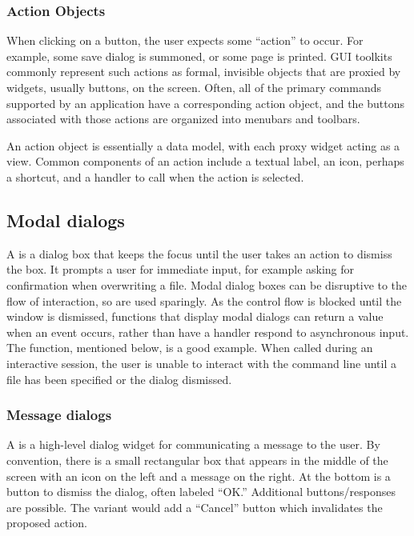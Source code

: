 \subsubsection{Action Objects}
\label{sec:GUI:actions}

When clicking on a button, the user expects some ``action'' to
occur. For example, some save dialog is summoned, or some page is
printed.  GUI toolkits commonly represent such actions as formal,
invisible objects that are proxied by widgets, usually buttons, on the
screen.  Often, all of the primary commands supported by an
application have a corresponding action object, and the buttons
associated with those actions are organized into menubars and
toolbars.

An action object is essentially a data model, with each proxy widget
acting as a view. Common components of an action include a textual
label, an icon, perhaps a shortcut, and a handler to call
when the action is selected.


\subsection{Modal dialogs}
\label{sec:GUI:modal-dialogs}

A  is a dialog box that keeps the focus until
the user takes an action to dismiss the box. It prompts a user for
immediate input, for example asking for confirmation when overwriting
a file. Modal dialog boxes can be disruptive to the flow of
interaction, so are used sparingly. As the control flow is
blocked until the window is dismissed, functions that display modal
dialogs can return a value when an event occurs, rather than have a
handler respond to asynchronous input. The 
function, mentioned below, is a good example. When called during an
interactive \R\/ session, the user is unable to interact with the
command line until a file has been specified or the dialog dismissed.

\subsubsection{Message dialogs}
\label{sec:GUI:message-dialogs}

A  is a high-level dialog widget for
communicating a message to the user. By convention, there is a small
rectangular box that appears in the middle of the screen with an icon
on the left and a message on the right. At the bottom is a button to
dismiss the dialog, often labeled ``OK.''  Additional
buttons/responses are possible. The 
variant would add a ``Cancel'' button which invalidates the proposed
action.


